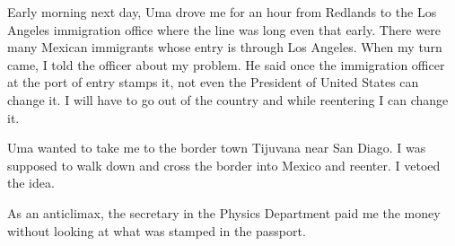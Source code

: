 Early morning next day, Uma drove me for an hour from Redlands to the 
Los Angeles immigration office where the line was long even that early. 
There were many Mexican immigrants whose entry is through Los Angeles. 
When my turn came, I told the officer about my problem. He said once the 
immigration officer at the port of entry stamps it, not even the 
President of United States can change it. I will have to go out of the 
country and while reentering I can change it.
\smallskip

Uma wanted to take me to the border town Tijuvana near San Diago. I was 
supposed to walk down and cross the border into Mexico and reenter. I 
vetoed the idea.
\smallskip

As an anticlimax, the secretary in the Physics Department paid me the 
money without looking at what was stamped in the passport.

